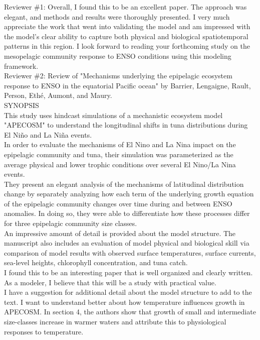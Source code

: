 \documentclass[12pt]{article}
\begin{document}
Reviewer \#1: Overall, I found this to be an excellent paper. The approach was elegant, and methods and results were thoroughly presented. I very much appreciate the work that went into validating the model and am impressed with the model's clear ability to capture both physical and biological spatiotemporal patterns in this region. I look forward to reading your forthcoming study on the mesopelagic community response to ENSO conditions using this modeling framework.\\

Reviewer \#2: Review of "Mechanisms underlying the epipelagic ecosystem response to ENSO in the equatorial Pacific ocean" by Barrier, Lengaigne, Rault, Person, Ethé, Aumont, and Maury.\\

SYNOPSIS \\

This study uses hindcast simulations of a mechanistic ecosystem model "APECOSM" to understand the longitudinal shifts in tuna distributions during El Niño and La Niña events.\\

In order to evaluate the mechanisms of El Nino and La Nina impact on the epipelagic community and tuna, their simulation was parameterized as the average physical and lower trophic conditions over several El Nino/La Nina events.\\

They present an elegant analysis of the mechanisms of latitudinal distribution change by separately analyzing how each term of the underlying growth equation of the epipelagic community changes over time during and between ENSO anomalies. In doing so, they were able to differentiate how these processes differ for three epipelagic community size classes.\\

An impressive amount of detail is provided about the model structure. The manuscript also includes an evaluation of model physical and biological skill via comparison of model results with observed surface temperatures, surface currents, sea-level heights, chlorophyll concentration, and tuna catch.\\

I found this to be an interesting paper that is well organized and clearly written. As a modeler, I believe that this will be a study with practical value.\\

I have a suggestion for additional detail about the model structure to add to the text. I want to understand better about how temperature influences growth in APECOSM. In section 4, the authors show that growth of small and intermediate size-classes increase in warmer waters and attribute this to physiological responses to temperature.\\
\end{document}
